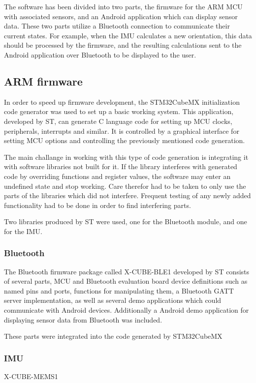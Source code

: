 The software has been divided into two parts, the firmware for the ARM MCU with associated sensors, and an Android application which can display sensor data. These two parts utilize a Bluetooth connection to communicate their current states. For example, when the IMU calculates a new orientation, this data should be processed by the firmware, and the resulting calculations sent to the Android application over Bluetooth to be displayed to the user.

\subsection{ARM firmware}
In order to speed up firmware development, the STM32CubeMX \cite{stm32cubemx} initialization code generator was used to set up a basic working system. This application, developed by ST, can generate C language code for setting up MCU clocks, peripherals, interrupts and similar. It is controlled by a graphical interface for setting MCU options and controlling the previously mentioned code generation.

The main challange in working with this type of code generation is integrating it with software libraries not built for it. If the library interferes with generated code by overriding functions and register values, the software may enter an undefined state and stop working. Care therefor had to be taken to only use the parts of the libraries which did not interfere. Frequent testing of any newly added functionality had to be done in order to find interfering parts.

Two libraries produced by ST were used, one for the Bluetooth module, and one for the IMU.
\subsubsection{Bluetooth}
The Bluetooth firmware package called X-CUBE-BLE1 \cite{x-cube-ble1} developed by ST consists of several parts, MCU and Bluetooth evaluation board device definitions such as named pins and ports, functions for manipulating them, a Bluetooth GATT server implementation, as well as several demo applications which could communicate with Android devices. Additionally a Android demo application for displaying sensor data from Bluetooth was included.

These parts were integrated into the code generated by STM32CubeMX

\subsubsection{IMU}
X-CUBE-MEMS1 \cite{x-cube-mems1}

